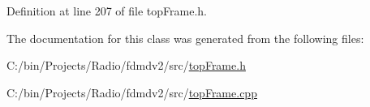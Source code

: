 Definition at line 207 of file top\-Frame.\-h.



The documentation for this class was generated from the following files\-:\begin{DoxyCompactItemize}
\item 
C\-:/bin/\-Projects/\-Radio/fdmdv2/src/\hyperlink{top_frame_8h}{top\-Frame.\-h}\item 
C\-:/bin/\-Projects/\-Radio/fdmdv2/src/\hyperlink{top_frame_8cpp}{top\-Frame.\-cpp}\end{DoxyCompactItemize}
